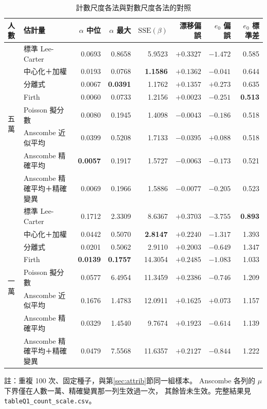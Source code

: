 \documentclass[UTF8, fontset=macnew, a4paper, 12pt]{ctexart}
\begin{document}
\begin{table}[H]
\centering
\caption{計數尺度各法與對數尺度各法的對照}
\small
\renewcommand{\arraystretch}{1.08}
\begin{tabular}{llrrrrrr}
\toprule
人數 & 估計量 & $\alpha$ 中位 & $\alpha$ 最大 & $\mathrm{SSE}(\beta)$
& 漂移偏誤 & $e_0$ 偏誤 & $e_0$ 標準差\\
\midrule
\multirow{8}{*}{五萬}
 & 標準 Lee-Carter & 0.0693 & 0.8658 & 5.9523 & $+0.3327$ & $-1.472$ & 0.585\\
 & 中心化＋加權 & 0.0193 & 0.0768 & \textbf{1.1586} & $+0.1362$ & $-0.041$ & 0.644\\
 & 分離式 & 0.0067 & \textbf{0.0391} & 1.1762 & $+0.1357$ & $+0.273$ & 0.635\\
 & Firth & 0.0060 & 0.0733 & 1.2156 & $\mathbf{+0.0023}$ & $-0.251$ & \textbf{0.513}\\
 & Poisson 擬分數 & 0.0080 & 0.1945 & 1.4098 & $-0.0043$ & $-0.186$ & 0.518\\
 & Anscombe 近似平均 & 0.0399 & 0.5208 & 1.7133 & $-0.0395$ & $+0.088$ & 0.518\\
 & Anscombe 精確平均 & \textbf{0.0057} & 0.1917 & 1.5727 & $-0.0063$ & $-0.173$ & 0.521\\
 & Anscombe 精確平均＋精確變異 & 0.0069 & 0.1966 & 1.5886 & $-0.0077$ & $-0.205$ & 0.523\\
\midrule
\multirow{8}{*}{一萬}
 & 標準 Lee-Carter & 0.1712 & 2.3309 & 8.6367 & $+0.3703$ & $-3.755$ & \textbf{0.893}\\
 & 中心化＋加權 & 0.0442 & 0.5070 & \textbf{2.8147} & $+0.2240$ & $-1.317$ & 1.393\\
 & 分離式 & 0.0201 & 0.5062 & 2.9110 & $+0.2003$ & $-0.649$ & 1.347\\
 & Firth & \textbf{0.0139} & \textbf{0.1757} & 14.3054 & $+0.2485$ & $-1.083$ & 1.033\\
 & Poisson 擬分數 & 0.0577 & 6.4954 & 11.3459 & $+0.2386$ & $-0.746$ & 1.209\\
 & Anscombe 近似平均 & 0.1676 & 1.4783 & 12.0911 & $\mathbf{+0.1625}$ & $+0.073$ & 1.157\\
 & Anscombe 精確平均 & 0.0329 & 1.4540 & 9.7674 & $+0.1923$ & $-0.614$ & 1.139\\
 & Anscombe 精確平均＋精確變異 & 0.0479 & 7.5568 & 11.6357 & $+0.2127$ & $-0.844$ & 1.222\\
\bottomrule
\end{tabular}

\vspace{2pt}
\parbox{0.92\textwidth}{\footnotesize 註：重複 100 次、固定種子，與第\ref{sec:attrib}節同一組樣本。
Anscombe 各列的 $\mu$ 下界僅在人數一萬、精確變異那一列生效過一次，
其餘皆未生效。完整結果見 \texttt{tableQ1\_count\_scale.csv}。}
\label{tab:count}
\end{table}
\end{document}
